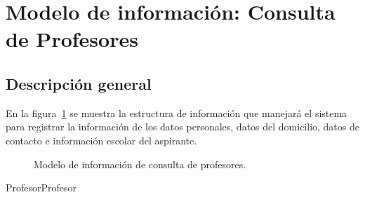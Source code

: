 \newpage

\section{Modelo de información: Consulta de Profesores}

\subsection{Descripción general}

En la figura~\ref{fig:modeloinfoprofe} se muestra la estructura de información que manejará el sistema para registrar la información de los datos personales, datos del domicilio, datos de contacto e información escolar del aspirante.

\begin{figure}[htbp!]
	\begin{center}
		\caption{Modelo de información de consulta de profesores.}
		\label{fig:modeloinfoprofe}
	\end{center}
\end{figure}


\begin{BusinessEntity}{Profesor}{Profesor}
	
	
	
	
\end{BusinessEntity}

